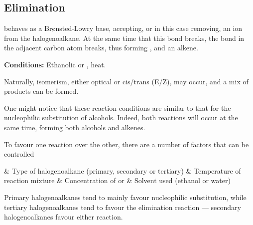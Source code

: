 
		\pagebreak
		\hypertarget{HydrogenHalideElimination}{}
		\subsection{Elimination}

			 behaves as a Brønsted-Lowry base, accepting, or in this case removing, an  ion from the halogenoalkane.
			At the same time that this  bond breaks, the  bond in the adjacent carbon atom breaks, thus forming
			, and an alkene.

			\vspace{1.5em}
			\vbox{\textbf{Conditions:}	\tabto{35mm}Ethanolic  or , heat.}


			Naturally, isomerism, either optical or cis/trans (E/Z), may occur, and a mix of products can be formed.

			One might notice that these reaction conditions are similar to that for the nucleophilic substitution of alcohols. Indeed,
			both reactions will occur at the same time, forming both alcohols and alkenes.

			To favour one reaction over the other, there are a number of factors that can be controlled

			\begin{bulletlist}
				& Type of halogenoalkane (primary, secondary or tertiary)
				& Temperature of reaction mixture
				& Concentration of  or 
				& Solvent used (ethanol or water)
			\end{bulletlist}

			Primary halogenoalkanes tend to mainly favour nucleophilic substitution, while tertiary halogenoalkanes tend to favour the
			elimination reaction --- secondary halogenoalkanes favour either reaction.

